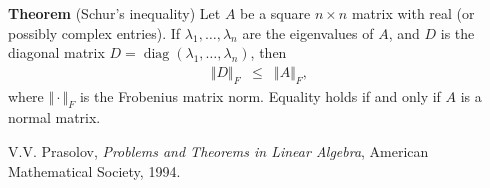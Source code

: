 \documentclass[12pt]{article}
\begin{document}
{\bf Theorem} (Schur's inequality)
Let $A$ be a square $n\times n$ matrix with
real (or possibly complex entries). 
If $\lambda_1,\ldots, \lambda_n$ are the eigenvalues of $A$, and
$D$ is the diagonal matrix $D=\operatorname{diag}(\lambda_1,\ldots, \lambda_n)$,
then
\begin{eqnarray*}
\Vert D \Vert_F &\le& \Vert A \Vert_F,
\end{eqnarray*}
where $\Vert\cdot \Vert_F$ is the Frobenius matrix norm.
Equality holds if and only if $A$ is a normal matrix.

\begin{thebibliography}{9}
 V.V. Prasolov,
\emph{Problems and Theorems in Linear Algebra},
American Mathematical Society, 1994.
 \end{thebibliography}
\end{document}
